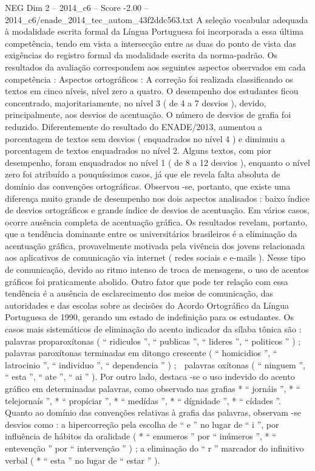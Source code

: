 \begin{textsample}{NEG Dim 2 – 2014\_c6 – Score -2.00 – 2014\_c6/enade\_2014\_tec\_autom\_43f2ddc563.txt}
A seleção vocabular adequada à modalidade escrita formal da Língua Portuguesa foi incorporada a essa última competência, tendo em vista a intersecção entre as duas do ponto de vista das exigências do registro formal da modalidade escrita da norma-padrão.
Os resultados da avaliação correspondem aos seguintes aspectos observados em cada competência : Aspectos ortográficos : A correção foi realizada classificando os textos em cinco níveis, nível zero a quatro.
O desempenho dos estudantes ficou concentrado, majoritariamente, no nível 3 ( de 4 a 7 desvios ), devido, principalmente, aos desvios de acentuação.
O número de desvios de grafia foi reduzido.
Diferentemente do resultado do ENADE/2013, aumentou a porcentagem de textos sem desvios ( enquadrados no nível 4 ) e diminuiu a porcentagem de textos enquadrados no nível 2.
Alguns textos, com pior desempenho, foram enquadrados no nível 1 ( de 8 a 12 desvios ), enquanto o nível zero foi atribuído a pouquíssimos casos, já que ele revela falta absoluta de domínio das convenções ortográficas.
Observou -se, portanto, que existe uma diferença muito grande de desempenho nos dois aspectos analisados : baixo índice de desvios ortográficos e grande índice de desvios de acentuação.
Em vários casos, ocorre ausência completa de acentuação gráfica.
Os resultados revelam, portanto, que a tendência dominante entre os universitários brasileiros é a eliminação da acentuação gráfica, provavelmente motivada pela vivência dos jovens relacionada aos aplicativos de comunicação via internet ( redes sociais e e-mails ).
Nesse tipo de comunicação, devido ao ritmo intenso de troca de mensagens, o uso de acentos gráficos foi praticamente abolido.
Outro fator que pode ter relação com essa tendência é a ausência de esclarecimento dos meios de comunicação, das autoridades e das escolas sobre as decisões do Acordo Ortográfico da Língua Portuguesa de 1990, gerando um estado de indefinição para os estudantes.
Os casos mais sistemáticos de eliminação do acento indicador da sílaba tônica são :  palavras proparoxítonas ( “ ridiculos ”, “ publicas ”, “ lideres ”, “ politicos ” ) ;  palavras paroxítonas terminadas em ditongo crescente ( “ homicidios ”, “ latrocinio ”, “ individuo ”, “ dependencia ” ) ;  palavras oxítonas ( “ ninguem ”, “ esta ”, “ ate ”, “ ai ” ).
Por outro lado, destaca -se o uso indevido do acento gráfico em determinadas palavras, como observado nas grafias * “ jornáis ”, * “ telejornaís ”, * “ propíciar ”, * “ medídas ”, * “ dígnidade ”, * “ cídades ”.
Quanto ao domínio das convenções relativas à grafia das palavras, observam -se desvios como : a hipercorreção pela escolha de “ e ” no lugar de “ i ”, por influência de hábitos da oralidade ( * “ enumeros ” por “ inúmeros ”, * “ entevenção ” por “ intervenção ” ) ; a eliminação do “ r ” marcador do infinitivo verbal ( * “ esta ” no lugar de “ estar ” ).

\end{textsample}
